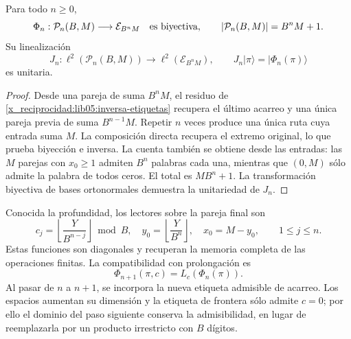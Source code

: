 \begin{theorem}
\label{x_reciprocidad:lib05:teo-rutas}
Para todo \(n\geq0\),
\begin{equation}
 \Phi_n:\mathcal P_n(B,M)\longrightarrow\mathcal E_{B^nM}
 \quad\hbox{es biyectiva},\qquad
 |\mathcal P_n(B,M)|=B^nM+1.
 \label{x_reciprocidad:lib05:biyeccion-rutas}
\end{equation}
Su linealización
\begin{equation}
 J_n:\ell^2(\mathcal P_n(B,M))\longrightarrow
          \ell^2(\mathcal E_{B^nM}),\qquad
 J_n|\pi\rangle=|\Phi_n(\pi)\rangle
 \label{x_reciprocidad:lib05:jn}
\end{equation}
es unitaria.
\end{theorem}

\begin{proof}
Desde una pareja de suma \(B^nM\), el residuo de
\eqref{x_reciprocidad:lib05:inversa-etiquetas} recupera el último acarreo y una
única pareja previa de suma \(B^{n-1}M\). Repetir \(n\) veces
produce una única ruta cuya entrada suma \(M\). La composición
directa recupera el extremo original, lo que prueba biyección e
inversa. La cuenta también se obtiene desde las entradas: las
\(M\) parejas con \(x_0\geq1\) admiten \(B^n\) palabras cada
una, mientras que \((0,M)\) sólo admite la palabra de todos
ceros. El total es \(MB^n+1\). La transformación biyectiva de
bases ortonormales demuestra la unitariedad de \(J_n\).
\end{proof}

Conocida la profundidad, los lectores sobre la pareja final son
\begin{equation}
 c_j=\left\lfloor\frac{Y}{B^{n-j}}\right\rfloor\bmod B,
 \quad y_0=\left\lfloor\frac{Y}{B^n}\right\rfloor,
 \quad x_0=M-y_0,
 \qquad 1\leq j\leq n.
 \label{x_reciprocidad:lib05:lectores-ruta}
\end{equation}
Estas funciones son diagonales y recuperan la memoria completa de
las operaciones finitas. La compatibilidad con prolongación es
\begin{equation}
 \Phi_{n+1}(\pi,c)=L_c(\Phi_n(\pi)).
 \label{x_reciprocidad:lib05:compatibilidad-prolongacion}
\end{equation}
Al pasar de \(n\) a \(n+1\), se incorpora la nueva etiqueta
admisible de acarreo. Los espacios aumentan su dimensión y la
etiqueta de frontera sólo admite \(c=0\); por ello el dominio del
paso siguiente conserva la admisibilidad, en lugar de reemplazarla
por un producto irrestricto con \(B\) dígitos.

